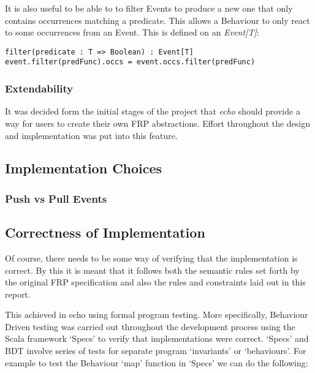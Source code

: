 \documentclass[12pt]{article}
\begin{document}
        It is also useful to be able to to filter Events to produce a new one that only
        contains occurrences matching a predicate. This allows a Behaviour to only react
        to some occurrences from an Event. This is defined on an \emph{Event[T]}:
 
\begin{verbatim}
filter(predicate : T => Boolean) : Event[T]
event.filter(predFunc).occs = event.occs.filter(predFunc)
\end{verbatim}        
        
      \subsubsection{Extendability}
        It was decided form the initial stages of the project that \emph{echo} should provide
        a way for users to create their own FRP abstractions. Effort throughout the design and
        implementation was put into this feature.
        
      
    \subsection{Implementation Choices}
      
      \subsubsection{Push vs Pull Events}
    
    \subsection{Correctness of Implementation}
      Of course, there needs to be some way of verifying that the implementation is correct. By
      this it is meant that it follows both the semantic rules set forth by the original FRP specification
      and also the rules and constraints laid out in this report.
      
      This achieved in echo using formal program testing. More specifically, Behaviour Driven
      testing was carried out throughout the development process using the Scala framework `Specs'
      to verify that implementations were correct. `Specs' and BDT involve series of tests for
      separate program `invariants' or `behaviours'. For example to test the Behaviour `map' function
      in `Specs' we can do the following:
 
\end{document}
